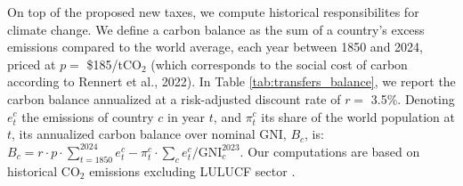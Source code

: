 \documentclass[12pt,english]{article}
\begin{document}
On top of the proposed new taxes, we compute historical responsibilites for climate change. We define a carbon balance as the sum of a country's excess emissions compared to the world average, each year between 1850 and 2024, priced at $p=$ \$185/tCO$_\text{2}$ (which corresponds to the social cost of carbon according to Rennert et al., 2022\citealp{rennert_comprehensive_2022}). 
In Table \ref{tab:transfers_balance}, we report the carbon balance annualized at a risk-adjusted discount rate of $r =$ 3.5\%. Denoting $e_t^c$ the emissions of country $c$ in year $t$, and $\pi_t^c$ its share of the world population at $t$, its annualized carbon balance over nominal GNI, $B_c$, is: $ B_c = r \cdot p \cdot \sum_{t=1850}^{2024} e_t^c - \pi_t^c \cdot \sum_c e_t^c / \text{GNI}_c^{2023}\text{.}$ Our computations are based on historical CO$_\text{2}$ emissions excluding LULUCF sector \citep{gutschow_country-resolved_2021}.



\clearpage
\listoftables
\listoffigures




% 
\end{document}
